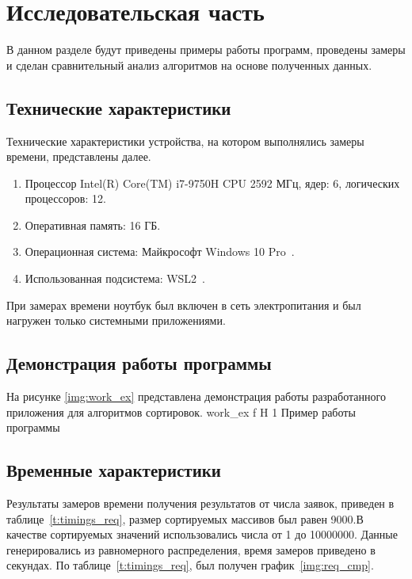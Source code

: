 \chapter{Исследовательская часть}

В данном разделе будут приведены примеры работы программ, проведены замеры и сделан сравнительный анализ алгоритмов на основе полученных данных.


\section{Технические характеристики}

Технические характеристики устройства, на котором выполнялись замеры времени, представлены далее.

\begin{enumerate}
	\item Процессор	Intel(R) Core(TM) i7-9750H CPU 2592 МГц, ядер: 6, логических процессоров: 12.
	\item Оперативная память: 16 ГБ.
	\item Операционная система: Майкрософт Windows 10 Pro~\cite{windows}.
	\item Использованная подсистема: WSL2~\cite{WSL2}.
\end{enumerate}

При замерах времени ноутбук был включен в сеть электропитания и был нагружен только системными приложениями.



\section{Демонстрация работы программы}

На рисунке \ref{img:work_ex} представлена демонстрация работы разработанного приложения для алгоритмов сортировок.
{work_ex} %
{f} %
{H} %
{1\textwidth} %
{Пример работы программы} %



\section{Временные характеристики}

Результаты замеров времени получения результатов от числа заявок, приведен в таблице~\ref{t:timings_req}, размер сортируемых массивов был равен 9000.В качестве сортируемых значений использовались  числа от 1 до 10000000. Данные генерировались из равномерного распределения, время замеров приведено в секундах. По таблице~\ref{t:timings_req}, был получен график~\ref{img:req_cmp}.

